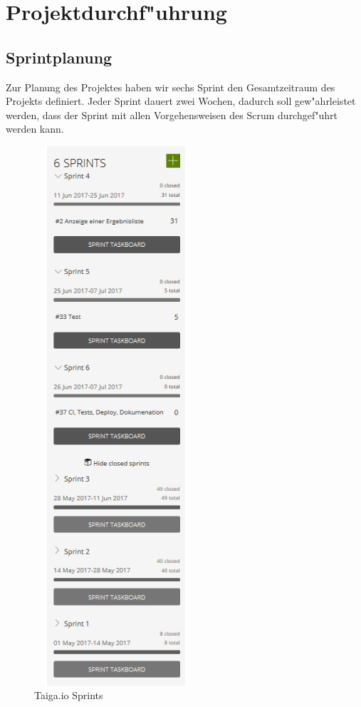 \documentclass[a4paper, 11pt]{scrreprt}
\begin{document}
\section{Projektdurchf"uhrung}

\subsection{Sprintplanung}

Zur Planung des Projektes haben wir sechs Sprint den Gesamtzeitraum des Projekts definiert. Jeder Sprint dauert zwei
Wochen, dadurch soll gew"ahrleistet werden, dass der Sprint mit allen Vorgehensweisen des Scrum durchgef"uhrt werden kann. 

\begin{figure} [H]
\begin{center}

\includegraphics[width=6cm, height=20cm]{sprints.png}
\caption{Taiga.io Sprints}

\end{center}
\end{figure}
\end{document}
